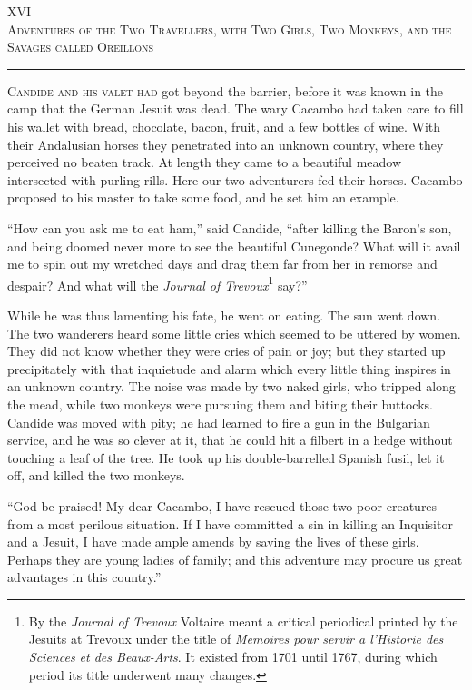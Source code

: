 \begin{center}
XVI\\
\textsc{Adventures of the Two Travellers, with Two Girls, Two Monkeys, and the Savages called Oreillons}
\end{center}
\vspace{-0.5cm}
\rule{\textwidth}{0.5pt}
\lettrine{C}{andide and his valet had} got beyond the barrier, before it was known in the camp that the German Jesuit was dead. The wary Cacambo had taken care to fill his wallet with bread, chocolate, bacon, fruit, and a few bottles of wine. With their Andalusian horses they penetrated into an unknown country, where they perceived no beaten track. At length they came to a beautiful meadow intersected with purling rills. Here our two adventurers fed their horses. Cacambo proposed to his master to take some food, and he set him an example.

``How can you ask me to eat ham,'' said Candide, ``after killing the Baron's son, and being doomed never more to see the beautiful Cunegonde? What will it avail me to spin out my wretched days and drag them far from her in remorse and despair? And what will the \textit{Journal of Trevoux}\footnote{By the \textit{Journal of Trevoux} Voltaire meant a critical periodical printed by the Jesuits at Trevoux under the title of \textit{Memoires pour servir a l'Historie des Sciences et des Beaux-Arts}. It existed from 1701 until 1767, during which period its title underwent many changes.} say?''

While he was thus lamenting his fate, he went on eating. The sun went down. The two wanderers heard some little cries which seemed to be uttered by women. They did not know whether they were cries of pain or joy; but they started up precipitately with that inquietude and alarm which every little thing inspires in an unknown country. The noise was made by two naked girls, who tripped along the mead, while two monkeys were pursuing them and biting their buttocks. Candide was moved with pity; he had learned to fire a gun in the Bulgarian service, and he was so clever at it, that he could hit a filbert in a hedge without touching a leaf of the tree. He took up his double-barrelled Spanish fusil, let it off, and killed the two monkeys.

``God be praised! My dear Cacambo, I have rescued those two poor creatures from a most perilous situation. If I have committed a sin in killing an Inquisitor and a Jesuit, I have made ample amends by saving the lives of these girls. Perhaps they are young ladies of family; and this adventure may procure us great advantages in this country.''

